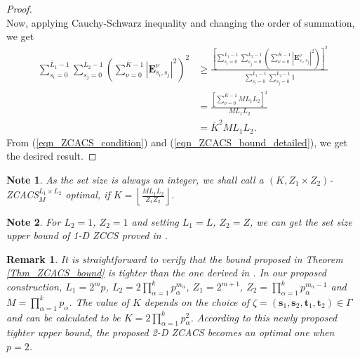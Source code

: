 \documentclass[pdflatex,sn-mathphys-num]{sn-jnl}%
\theoremstyle{thmstyleone}
\newtheorem{remark}{Remark}
\newtheorem{note}{Note}
\newcommand{\floor}[1]{\left\lfloor #1 \right\rfloor}
\begin{document}
\begin{proof}
\begin{equation}
		\end{equation}
		Now, applying Cauchy-Schwarz inequality and changing the order of summation, we get
		\begin{equation}\label{eqn_ZCACS_bound_detailed}
			\begin{split}
				\sum_{s_i=0}^{\overline{L}_1-1} \sum_{s_j=0}^{\overline{L}_2-1} \left( \sum_{\nu=0}^{\overline{K}-1}  \left| \mathbf{E}^{\nu}_{s_i,s_j} \right|^2 \right)^2
				& \geq \frac{\left[ \sum_{s_i=0}^{\overline{L}_1-1} \sum_{s_j=0}^{\overline{L}_2-1} \left( \sum_{\nu=0}^{\overline{K}-1}  \left| \mathbf{E}^{\nu}_{s_i,s_j} \right|^2 \right) \right]^2}{\sum_{s_i=0}^{\overline{L}_1-1} \sum_{s_j=0}^{\overline{L}_2-1} 1}\\
				& = \frac{\left[\sum_{\nu=0}^{\overline{K}-1} M L_1 L_2 \right]^2}{M L_1 L_2} \\
				&= \overline{K}^2 M L_1 L_2.
			\end{split}
		\end{equation}
		From (\ref{eqn_ZCACS_condition}) and (\ref{eqn_ZCACS_bound_detailed}), we get
		the desired result.
	\end{proof}
	
	\begin{note}
		As the set size is always an integer, we shall call a $(K, Z_1 \times Z_2)$-ZCACS${}_{M}^{L_1 \times L_2}$ optimal, if $K = \floor{ \frac{M L_1 L_2}{Z_1 Z_2}}$.
	\end{note}	
	
	\begin{note}
		For $L_2=1$, $Z_2=1$ and setting $L_1=L$, $Z_2=Z$, we can get the set size upper bound of 1-D ZCCS proved in \cite{pai2024ZCCSbound}.
	\end{note}
	
	\begin{remark}
		It is straightforward to verify that the bound proposed in \textit{Theorem \ref{Thm_ZCACS_bound}} is tighter than the one derived in \cite{ZengZCACS2}. In our proposed construction, $L_1= 2^m p$, $L_2= 2 \prod_{\alpha=1}^{k} p_\alpha^{m_\alpha}$, $Z_1= 2^{m+1} $, $Z_2=  \prod_{\alpha=1}^{k} p_{\alpha}^{m_\alpha-1}$ and $M= \prod_{\alpha=1}^{k} p_\alpha$. The value of $K$ depends on the choice of $ \zeta = (\mathbf{s}_1, \mathbf{s}_2, \mathbf{t}_1, \mathbf{t}_2) \in \Gamma$ and can be calculated to be $K= 2 \prod_{\alpha=1}^{k} p_\alpha^2$. According to this newly proposed tighter upper bound, the proposed 2-D ZCACS becomes an optimal one when $p=2$.
	\end{remark}
	
\end{document}
